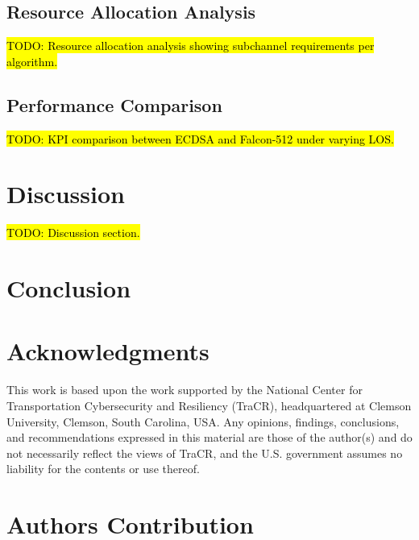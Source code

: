 \documentclass[letterpaper,journal]{IEEEtran}
\begin{document}
\subsection{Resource Allocation Analysis}

\hl{TODO: Resource allocation analysis showing subchannel requirements per algorithm.}

\subsection{Performance Comparison}

\hl{TODO: KPI comparison between ECDSA and Falcon-512 under varying LOS.}

\section{Discussion}
\label{sec:discussion}

\hl{TODO: Discussion section.}

\section{Conclusion}
\label{sec:conclusion}






\section*{Acknowledgments}
This work is based upon the work supported by the National Center for Transportation Cybersecurity and Resiliency (TraCR), headquartered at Clemson University, Clemson, South Carolina, USA. Any opinions, findings, conclusions, and recommendations expressed in this material are those of the author(s) and do not necessarily reflect the views of TraCR, and the U.S. government assumes no liability for the contents or use thereof.

\section*{Authors Contribution}
\end{document}
